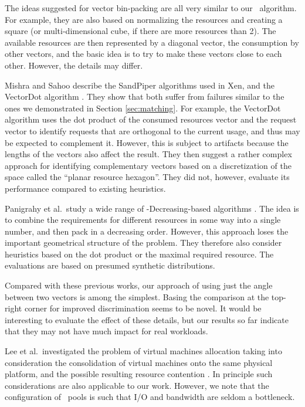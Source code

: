 The ideas suggested for vector bin-packing are all very similar to our
\mif\ algorithm.
For example, they are also based on normalizing the resources and
creating a square (or multi-dimensional cube, if there are more
resources than 2).
The available resources are then represented by a diagonal vector, the
consumption by other vectors, and the basic idea is to try to make
these vectors close to each other.
However, the details may differ.

Mishra and Sahoo \cite{mishra11} describe the SandPiper algorithms
used in Xen, and the VectorDot algorithm \cite{singh08}.
They show that both suffer from failures similar to the ones we
demonstrated in Section \ref{sec:matching}.
For example, the VectorDot algorithm uses the dot product of the
consumed resources vector and the request vector to identify requests
that are orthogonal to the current usage, and thus may be expected to
complement it.
However, this is subject to artifacts because the lengths of the
vectors also affect the result.
They then suggest a rather complex approach for identifying
complementary vectors based on a discretization of the space called
the ``planar resource hexagon''.
They did not, however, evaluate its performance compared to existing
heuristics.

Panigrahy et al.\ study a wide range of \fif-Decreasing-based
algorithms \cite{panigrahy11}.
The idea is to combine the requirements for different resources in
some way into a single number, and then pack in a decreasing order.
However, this approach loses the important geometrical structure of
the problem.
They therefore also consider heuristics based on the dot product or
the maximal required resource.
The evaluations are based on presumed synthetic distributions.

Compared with these previous works, our approach of using just the
angle between two vectors is among the simplest.
Basing the comparison at the top-right corner for improved
discrimination seems to be novel.
It would be interesting to evaluate the effect of these details, but
our results so far indicate that they may not have much impact for
real workloads.

Lee et al.\ investigated the problem of virtual machines allocation
taking into consideration the consolidation of virtual machines onto
the same physical platform, and the possible resulting resource
contention \cite{sangmin}.
In principle such considerations are also applicable to our work.
However, we note that the configuration of \nb\ pools is such that I/O
and bandwidth are seldom a bottleneck.

